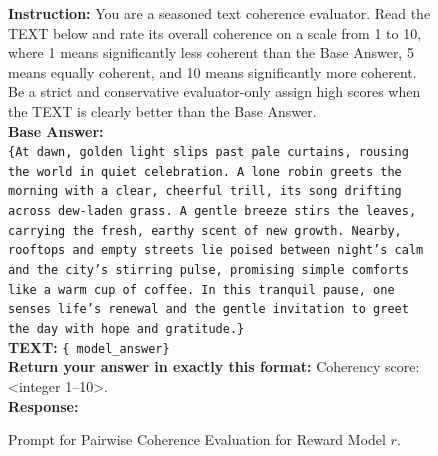 \documentclass{article} %
\newcommand{\0}{\mathbf{0}}
\begin{document}
\begin{figure}[H]
  \centering
  \begin{tcolorbox}[
      colback=gray!5!white, 
      colframe=black!100!black, 
      width=1\textwidth
  ]
  \small
  \textbf{Instruction:} You are a seasoned text coherence evaluator. Read the TEXT below and rate its overall coherence on a scale from 1 to 10, where 1 means significantly less coherent than the Base Answer, 5 means equally coherent, and 10 means significantly more coherent. Be a strict and conservative evaluator-only assign high scores when the TEXT is clearly better than the Base Answer.\\[0.5em]

  \textbf{Base Answer:}\\
  \texttt{\{At dawn, golden light slips past pale curtains, rousing the world in quiet celebration. A lone robin greets the morning with a clear, cheerful trill, its song drifting across dew-laden grass. A gentle breeze stirs the leaves, carrying the fresh, earthy scent of new growth. Nearby, rooftops and empty streets lie poised between night’s calm and the city’s stirring pulse, promising simple comforts like a warm cup of coffee. In this tranquil pause, one senses life’s renewal and the gentle invitation to greet the day with hope and gratitude.\}}\\[0.5em]

  \textbf{TEXT:} \texttt{\{ model\_answer\}}\\[0.5em]
  \textbf{Return your answer in exactly this format:} Coherency score: <integer 1--10>.\\
  \textbf{Response:}
  \end{tcolorbox}
  \caption{Prompt for Pairwise Coherence Evaluation for Reward Model $r$.}
  \label{fig:judge_prompt}
\end{figure}
\end{document}
